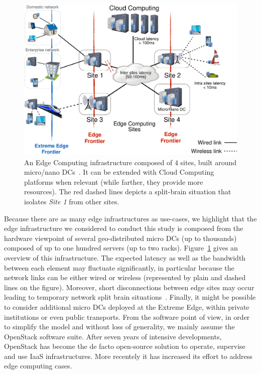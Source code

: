 \begin{figure}[t]
  \centering
  \includegraphics[width=\columnwidth]{./figures/figure_fog.pdf}
  \caption{An Edge Computing infrastructure composed of $4$ sites, built around
    micro/nano DCs~\cite{7923796}. It can be extended with Cloud Computing
    platforms when relevant (while farther, they provide more resources).
    The red dashed lines depicts a split-brain situation that isolates
    \emph{Site 1} from other sites.}
  \label{fig:fogedge-archi}
\end{figure}

Because there are as many edge infrastructures as use-cases, we
highlight that the edge infrastructure we considered to conduct this
study is composed from the hardware viewpoint of several
geo-distributed micro DCs (up to thousands)
composed of up to one hundred servers (up to two racks).
Figure~\ref{fig:fogedge-archi} gives an overview of this
infrastructure. The expected latency as well as the bandwidth between
each element may fluctuate significantly, in particular because the
network links can be either wired or wireless (represented by plain
and dashed lines on the figure). Moreover, short disconnections
between edge sites may occur leading to temporary network split brain
situations~\cite{4456903}. Finally, it might be possible
to consider additional micro DCs deployed at the Extreme Edge, within
private institutions or even public transports.
%
From the software point of view, in order to simplify the model and
without loss of generality, we mainly assume the OpenStack software
suite.  After seven years of intensive developments, OpenStack has
become the de facto open-source solution to operate, supervise and use
IaaS infrastructures. More recentely it has increased its effort to address edge computing cases. 

